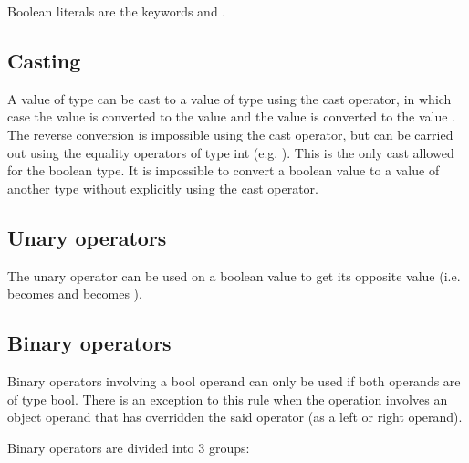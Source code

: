 Boolean literals are the keywords  and .

\subsection{Casting}
\label{sec:org7cd1f94}

A value of type  can be cast to a value of type  using
the cast operator, in which case the value  is converted to the
value  and the value  is converted to the value
. The reverse conversion is impossible using the cast operator, but
can be carried out using the equality operators of type int (e.g. ). This is the only cast allowed for the boolean type. It is impossible to
convert a boolean value to a value of another type without explicitly using the
cast operator.

\subsection{Unary operators}
\label{sec:orgb412ce4}

The unary operator \token{!} can be used on a boolean value to get its opposite
value (i.e.  becomes  and  becomes
).

\subsection{Binary operators}
\label{sec:org030ae50}

Binary operators involving a bool operand can only be used if both operands are
of type bool. There is an exception to this rule when the operation involves an
object operand that has overridden the said operator (as a left or right
operand).

Binary operators are divided into 3 groups:

